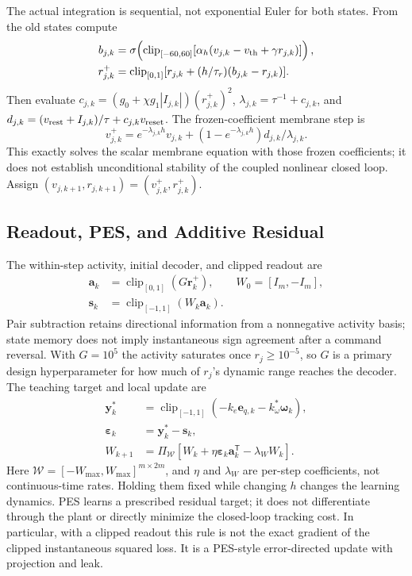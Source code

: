 \documentclass[letterpaper,10pt,conference]{IEEEtran}
\newcommand{\T}{^{\mathsf T}}
\newcommand{\clip}{\operatorname{clip}}
\begin{document}
The actual integration is sequential, not exponential Euler for both
states. From the old states compute
\begin{align}
 b_{j,k}&=\sigma\!\left(\clip_{[-60,60]}
       [\alpha_h(v_{j,k}-v_{\rm th}+\gamma r_{j,k})]\right),\\
 r_{j,k}^{+}&=\clip_{[0,1]}
       [r_{j,k}+(h/\tau_r)(b_{j,k}-r_{j,k})].
 \label{eq:gate_step}
\end{align}
Then evaluate $c_{j,k}=(g_0+\chi g_1|I_{j,k}|)(r_{j,k}^{+})^2$,
$\lambda_{j,k}=\tau^{-1}+c_{j,k}$, and
$d_{j,k}=(v_{\rm rest}+I_{j,k})/\tau+c_{j,k}v_{\rm reset}$. The
frozen-coefficient membrane step is
\begin{equation}
 v_{j,k}^{+}=e^{-\lambda_{j,k}h}v_{j,k}
       +(1-e^{-\lambda_{j,k}h})d_{j,k}/\lambda_{j,k}.
 \label{eq:mem_step}
\end{equation}
This exactly solves the scalar membrane equation with those frozen
coefficients; it does not establish unconditional stability of the coupled
nonlinear closed loop. Assign $(v_{j,k+1},r_{j,k+1})=(v_{j,k}^{+},r_{j,k}^{+})$.

\subsection{Readout, PES, and Additive Residual}
The within-step activity, initial decoder, and clipped readout are
\begin{equation}
 \begin{aligned}
 \bm a_k&=\clip_{[0,1]}(G\bm r_k^+),\qquad W_0=[I_m,-I_m],\\
 \bm s_k&=\clip_{[-1,1]}(W_k\bm a_k).
 \end{aligned}
 \label{eq:readout}
\end{equation}
Pair subtraction retains directional information from a nonnegative
activity basis; state memory does not imply instantaneous sign agreement
after a command reversal. With $G=10^5$ the activity saturates once
$r_j\ge10^{-5}$, so $G$ is a primary design hyperparameter for how much of
$r_j$'s dynamic range reaches the decoder. The teaching target and local update are
\begin{align}
 \bm y_k^*&=\clip_{[-1,1]}(-k_e\bm e_{q,k}-k_\omega^*\bm\omega_k),\\
 \bm\varepsilon_k&=\bm y_k^*-\bm s_k,\\
 W_{k+1}&=\Pi_{\mathcal W}
       [W_k+\eta\bm\varepsilon_k\bm a_k\T-\lambda_W W_k].
 \label{eq:pes}
\end{align}
Here $\mathcal W=[-W_{\max},W_{\max}]^{m\times2m}$, and
$\eta$ and $\lambda_W$ are per-step coefficients, not continuous-time
rates. Holding them fixed while changing $h$ changes the learning dynamics.
PES learns a prescribed residual target; it does not differentiate through
the plant or directly minimize the closed-loop tracking cost. In particular,
with a clipped readout this rule is not the exact gradient of the clipped
instantaneous squared loss. It is a PES-style error-directed update with
projection and leak.
\end{document}
